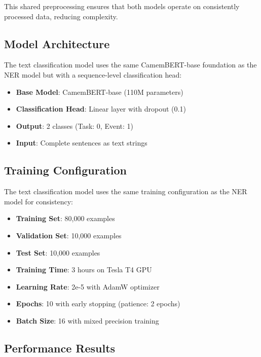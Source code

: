 \documentclass[12pt,a4paper]{article}
\begin{document}
This shared preprocessing ensures that both models operate on consistently processed data, reducing complexity.



\subsection{Model Architecture}

The text classification model uses the same CamemBERT-base foundation as the NER model but with a sequence-level classification head:

\begin{itemize}
    \item \textbf{Base Model}: CamemBERT-base (110M parameters)
    \item \textbf{Classification Head}: Linear layer with dropout (0.1)
    \item \textbf{Output}: 2 classes (Task: 0, Event: 1)
    \item \textbf{Input}: Complete sentences as text strings
\end{itemize}

\subsection{Training Configuration}

The text classification model uses the same training configuration as the NER model for consistency:

\begin{itemize}
    \item \textbf{Training Set}: 80,000 examples
    \item \textbf{Validation Set}: 10,000 examples
    \item \textbf{Test Set}: 10,000 examples
    \item \textbf{Training Time}: 3 hours on Tesla T4 GPU
    \item \textbf{Learning Rate}: 2e-5 with AdamW optimizer
    \item \textbf{Epochs}: 10 with early stopping (patience: 2 epochs)
    \item \textbf{Batch Size}: 16 with mixed precision training
\end{itemize}

\subsection{Performance Results}
\end{document}
